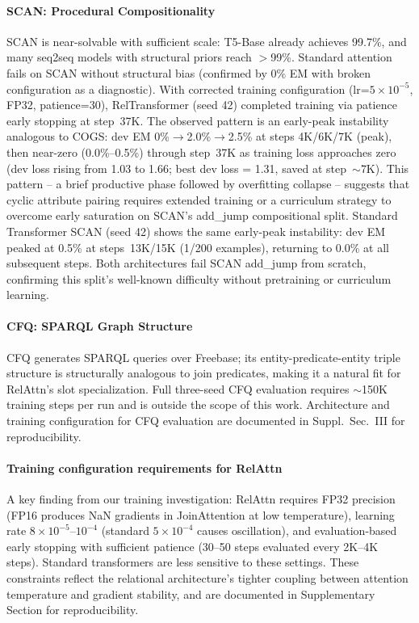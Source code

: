 \documentclass[conference]{IEEEtran}
\begin{document}
\paragraph{SCAN: Procedural Compositionality}
SCAN is near-solvable with sufficient scale: T5-Base already achieves 99.7\%, and many seq2seq models with structural priors reach $>$99\%. Standard attention fails on SCAN without structural bias (confirmed by 0\% EM with broken configuration as a diagnostic). With corrected training configuration (lr=$5{\times}10^{-5}$, FP32, patience=30), RelTransformer (seed 42) completed training via patience early stopping at step~37K. The observed pattern is an early-peak instability analogous to COGS: dev EM 0\%$\to$2.0\%$\to$2.5\% at steps 4K/6K/7K (peak), then near-zero (0.0\%--0.5\%) through step~37K as training loss approaches zero (dev loss rising from 1.03 to 1.66; best dev loss = 1.31, saved at step~$\sim$7K). This pattern -- a brief productive phase followed by overfitting collapse -- suggests that cyclic attribute pairing requires extended training or a curriculum strategy to overcome early saturation on SCAN's add\_jump compositional split. Standard Transformer SCAN (seed 42) shows the same early-peak instability: dev EM peaked at 0.5\% at steps~13K/15K (1/200 examples), returning to 0.0\% at all subsequent steps. Both architectures fail SCAN add\_jump from scratch, confirming this split's well-known difficulty without pretraining or curriculum learning.

\paragraph{CFQ: SPARQL Graph Structure}
CFQ generates SPARQL queries over Freebase; its entity-predicate-entity triple structure is structurally analogous to join predicates, making it a natural fit for RelAttn's slot specialization. Full three-seed CFQ evaluation requires ${\sim}$150K training steps per run and is outside the scope of this work. Architecture and training configuration for CFQ evaluation are documented in Suppl.\ Sec.~III for reproducibility.

\paragraph{Training configuration requirements for RelAttn}
A key finding from our training investigation: RelAttn requires FP32 precision (FP16 produces NaN gradients in JoinAttention at low temperature), learning rate $8{\times}10^{-5}$--$10^{-4}$ (standard $5{\times}10^{-4}$ causes oscillation), and evaluation-based early stopping with sufficient patience (30--50 steps evaluated every 2K--4K steps). Standard transformers are less sensitive to these settings. These constraints reflect the relational architecture's tighter coupling between attention temperature and gradient stability, and are documented in Supplementary Section for reproducibility.
\end{document}
